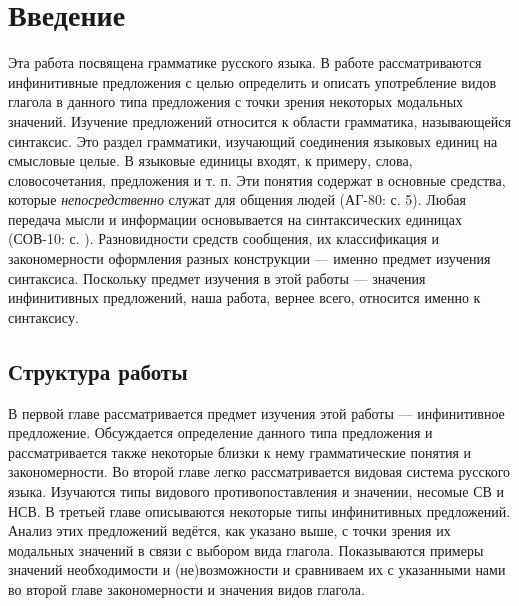 \section{Введение}
Эта работа посвящена грамматике русского языка. В работе рассматриваются инфинитивные предложения с целью определить и описать употребление видов глагола в данного типа предложения с точки зрения некоторых модальных значений. Изучение предложений относится к области грамматика, называющейся синтаксис. Это раздел грамматики, изучающий соединения языковых единиц на смысловые целые. В языковые единицы входят, к примеру, слова, словосочетания, предложения и т. п. Эти понятия содержат в основные средства, которые \textit{непосредственно} служат для общения людей (АГ-80: с. 5). Любая передача мысли и информации основывается на синтаксических единицах (СОВ-10: с. ). Разновидности средств сообщения, их классификация и закономерности оформления разных конструкции --- именно предмет изучения синтаксиса. Поскольку предмет изучения в этой работы --- значения инфинитивных предложений, наша работа, вернее всего, относится именно к синтаксису.
%
%

\subsection*{Структура работы}

В первой главе рассматривается предмет изучения этой работы --- инфинитивное предложение. Обсуждается определение данного типа предложения и рассматривается также некоторые близки к нему грамматические понятия и закономерности. Во второй главе легко рассматривается видовая система русского языка. Изучаются типы видового противопоставления и значении, несомые СВ и НСВ. В третьей главе описываются некоторые типы инфинитивных предложений.  Анализ этих предложений ведётся, как указано выше, с точки зрения их модальных значений в связи с выбором вида глагола. Показываются примеры значений необходимости и (не)возможности и сравниваем их с указанными нами во второй главе закономерности и значения видов глагола.